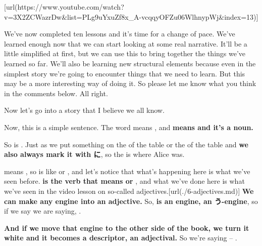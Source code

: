 \startsectionlevel[title={{\bf 11. Compound sentences, くれる, あげる and more uses of the て-form}},reference={compound-sentences-くれる-あげる-and-more-uses-of-the-て-form}]

[url(https://www.youtube.com/watch?v=3X2ZCWazrDw&list=PLg9uYxuZf8x_A-vcqqyOFZu06WlhnypWj&index=13)]

We've now completed ten lessons and it's time for a change of pace. We've learned enough now that we can start looking at some real narrative. It'll be a little simplified at first, but we can use this to bring together the things we've learned so far. We'll also be learning new structural elements because even in the simplest story we're going to encounter things that we need to learn. But this may be a more interesting way of doing it. So please let me know what you think in the comments below. All right.

Now let's go into a story that I believe we all know.


Now, this is a simple sentence. The word  means , and {\bf {} means  and it's a noun.}

{}

So  is . Just as we put something on the  of the table or the  of the table and {\bf we also always mark it with に}, so the  is where Alice was.

{}

 means , so  is like  or , and let's notice that what's happening here is what we've seen before. {\bf {} is the verb that means  or }, and what we've done here is what we've seen in the video lesson on so-called adjectives.\goto{{[}6{]}}[url(./6-adjectives.md)] {\bf We can make any engine into an adjective.} So, {\bf {} is an  engine, an う-engine}, so if we say  we are saying, .

{}

{\bf And if we move that  engine to the other side of the book, we turn it white and it becomes a descriptor, an adjectival.} So we're saying  -- .


